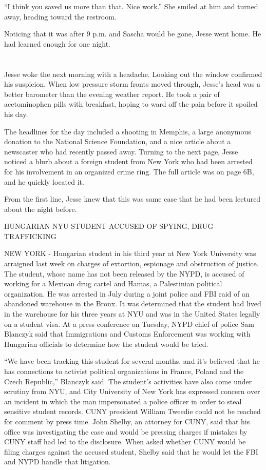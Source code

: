 \documentclass[12pt]{book}
\begin{document}
``I think you saved us more than that.  Nice work.''  She smiled at him and turned away, heading toward the restroom.

Noticing that it was after 9 p.m. and Sascha would be gone, Jesse went home.  He had learned enough for one night.

\chapter{}

Jesse woke the next morning with a headache.  Looking out the window confirmed his suspicion.  When low pressure storm fronts moved through, Jesse's head was a better barometer than the evening weather report.  He took a pair of acetominophen pills with breakfast, hoping to ward off the pain before it spoiled his day.

The headlines for the day included a shooting in Memphis, a large anonymous donation to the National Science Foundation, and a nice article about a newscaster who had recently passed away.  Turning to the next page, Jesse noticed a blurb about a foreign student from New York who had been arrested for his involvement in an organized crime ring.  The full article was on page 6B, and he quickly located it.

From the first line, Jesse knew that this was same case that he had been lectured about the night before.

\indent	HUNGARIAN NYU STUDENT ACCUSED OF SPYING, DRUG TRAFFICKING

\indent NEW YORK - Hungarian student in his third year at New York University was arraigned last week on charges of extortion, espionage and obstruction of justice.  The student, whose name has not been released by the NYPD, is accused of working for a Mexican drug cartel and Hamas, a Palestinian political organization.  He was arrested in July during a joint police and FBI raid of an abandoned warehouse in the Bronx.  It was determined that the student had lived in the warehouse for his three years at NYU and was in the United States legally on a student visa.  At a press conference on Tuesday, NYPD chief of police Sam Blanczyk said that Immigrations and Customs Enforcement was working with Hungarian officials to determine how the student would be tried.
	
\indent ``We have been tracking this student for several months, and it's believed that he has connections to activist political organizations in France, Poland and the Czech Republic,'' Blanczyk said.  The student's activities have also come under scrutiny from NYU, and City University of New York has expressed concern over an incident in which the man impersonated a police officer in order to steal sensitive student records.  CUNY president William Tweedie could not be reached for comment by press time.  John Shelby, an attorney for CUNY, said that his office was investigating the case and would be pressing charges if mistakes by CUNY staff had led to the disclosure.  When asked whether CUNY would be filing charges against the accused student, Shelby said that he would let the FBI and NYPD handle that litigation.
	
\end{document}
